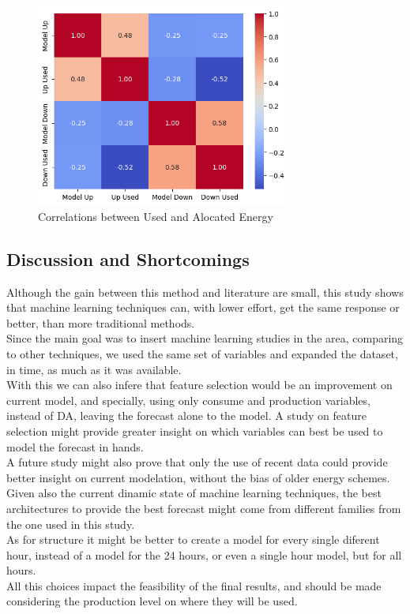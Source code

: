 \begin{figure}[H]
    \centering
    \includegraphics[width=0.75\textwidth]{plots/heatmap_correlation_pred.png}
    \caption{Correlations between Used and Alocated Energy}
    \label{fig:mode_pred_corres}
  \end{figure}

\par

\subsection{Discussion and Shortcomings}

\textcolor[rgb]{0.43, 0.21, 0.1}{
  Although the gain between this method and literature \cite{Algarvio2024} are small, this study shows that machine learning techniques can, with lower effort, get the same response or better, than more traditional methods. \\
  Since the main goal was to insert machine learning studies in the area, comparing to other techniques, we used the same set of variables and expanded the dataset, in time, as much as it was available. \\
  With this we can also infere that feature selection would be an improvement on current model, and specially, using only consume and production variables, instead of DA, leaving the forecast alone to the model. A study on feature selection might provide greater insight on which variables can best be used to model the forecast in hands. \\
  A future study might also prove that only the use of recent data could provide better insight on current modelation, without the bias of older energy schemes.\\
  Given also the current dinamic state of machine learning techniques, the best architectures to provide the best forecast might come from different families from the one used in this study.\\
  As for structure it might be better to create a model for every single diferent hour, instead of a model for the 24 hours, or even a single hour model, but for all hours. \\
  All this choices impact the feasibility of the final results, and should be made considering the production level on where they will be used.
}

